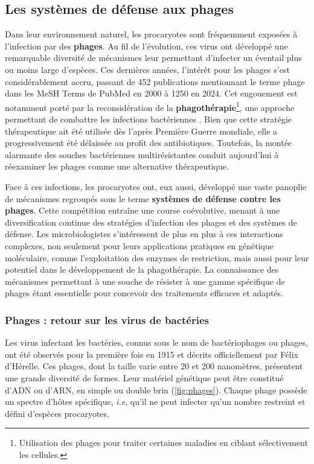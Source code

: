 \newpage

\subsection{Les systèmes de défense aux phages}
\label{sec:def}

Dans leur environnement naturel, les procaryotes sont fréquemment exposées à l’infection par des \textbf{phages}. Au fil de l’évolution, ces virus ont développé une remarquable diversité de mécanismes leur permettant d’infecter un éventail plus ou moins large d’espèces. Ces dernières années, l’intérêt pour les phages s’est considérablement accru, passant de 452 publications mentionnant le terme phage dans les MeSH Terms de PubMed en 2000 à 1250 en 2024. Cet engouement est notamment porté par la reconsidération de la \textbf{phagothérapie}\footnote{Utilisation des phages pour traiter certaines maladies en ciblant sélectivement les cellules.}, une approche permettant de combattre les infections bactériennes \cite{boniver_phage_2022}. Bien que cette stratégie thérapeutique ait été utilisée dès l’après Première Guerre mondiale, elle a progressivement été délaissée au profit des antibiotiques. Toutefois, la montée alarmante des souches bactériennes multirésistantes conduit aujourd’hui à réexaminer les phages comme une alternative thérapeutique.

Face à ces infections, les procaryotes ont, eux aussi, développé une vaste panoplie de mécanismes regroupés sous le terme \textbf{systèmes de défense contre les phages}. Cette compétition entraîne une course coévolutive, menant à une diversification continue des stratégies d’infection des phages et des systèmes de défense. Les microbiologistes s’intéressent de plus en plus à ces interactions complexes, non seulement pour leurs applications pratiques en génétique moléculaire, comme l’exploitation des enzymes de restriction, mais aussi pour leur potentiel dans le développement de la phagothérapie. La connaissance des mécanismes permettant à une souche de résister à une gamme spécifique de phages étant essentielle pour concevoir des traitements efficaces et adaptés.

\subsubsection{Phages : retour sur les virus de bactéries}
\label{sec:phage}
Les virus infectant les bactéries, connus sous le nom de bactériophages ou phages, ont été observés pour la première fois en 1915 et décrits officiellement par Félix d'Hérelle. Ces phages, dont la taille varie entre 20 et 200 nanomètres, présentent une grande diversité de formes. Leur matériel génétique peut être constitué d'ADN ou d'ARN, en simple ou double brin (\autoref{fig:phages}). Chaque phage possède un spectre d'hôtes spécifique, \textit{i.e}, qu'il ne peut infecter qu'un nombre restreint et défini d'espèces procaryotes.


